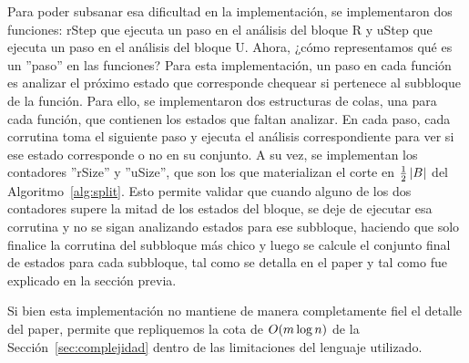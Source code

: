 Para poder subsanar esa dificultad en la implementación, se implementaron dos funciones: rStep que ejecuta un paso en el análisis del bloque R y uStep que ejecuta un paso en el análisis del bloque U. Ahora, ¿cómo representamos qué es un ''paso'' en las funciones? Para esta implementación, un paso en cada función es analizar el próximo estado que corresponde chequear si pertenece al subbloque de la función. Para ello, se implementaron dos estructuras de colas, una para cada función, que contienen los estados que faltan analizar. En cada paso, cada corrutina toma el siguiente paso y ejecuta el análisis correspondiente para ver si ese estado corresponde o no en su conjunto. A su vez, se implementan los contadores ''rSize'' y ''uSize'', que son los que materializan el corte en $\frac{1}{2}\left\lvert B \right\rvert$ del Algoritmo~\ref{alg:split}. Esto permite validar que cuando alguno de los dos contadores supere la mitad de los estados del bloque, se deje de ejecutar esa corrutina y no se sigan analizando estados para ese subbloque, haciendo que solo finalice la corrutina del subbloque más chico y luego se calcule el conjunto final de estados para cada subbloque, tal como se detalla en el paper y tal como fue explicado en la sección previa.

Si bien esta implementación no mantiene de manera completamente fiel el detalle del paper, permite que repliquemos la cota de ${O\!\left(m \log n\right)}$ de la Sección~\ref{sec:complejidad} dentro de las limitaciones del lenguaje utilizado.


